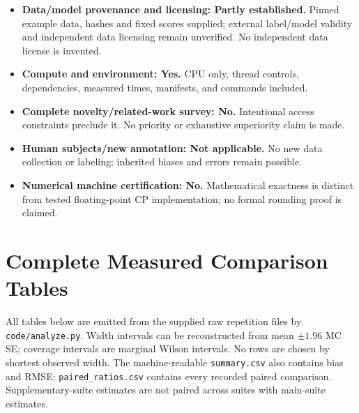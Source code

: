 \documentclass{article}
\begin{document}
\begin{itemize}
\item \textbf{Data/model provenance and licensing: Partly established.} Pinned example data, hashes and fixed scores supplied; external label/model validity and independent data licensing remain unverified. No independent data license is invented.
\item \textbf{Compute and environment: Yes.} CPU only, thread controls, dependencies, measured times, manifests, and commands included.
\item \textbf{Complete novelty/related-work survey: No.} Intentional access constraints preclude it. No priority or exhaustive superiority claim is made.
\item \textbf{Human subjects/new annotation: Not applicable.} No new data collection or labeling; inherited biases and errors remain possible.
\item \textbf{Numerical machine certification: No.} Mathematical exactness is distinct from tested floating-point CP implementation; no formal rounding proof is claimed.
\end{itemize}

\section{Complete Measured Comparison Tables}
All tables below are emitted from the supplied raw repetition files by \texttt{code/analyze.py}. Width intervals can be reconstructed from mean $\pm1.96$ MC SE; coverage intervals are marginal Wilson intervals. No rows are chosen by shortest observed width. The machine-readable \texttt{summary.csv} also contains bias and RMSE; \texttt{paired\_ratios.csv} contains every recorded paired comparison. Supplementary-suite estimates are not paired across suites with main-suite estimates.
\small



\end{document}
